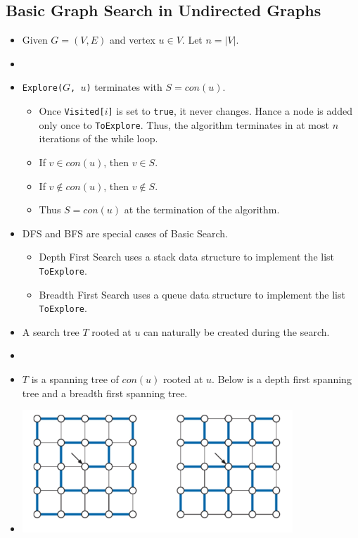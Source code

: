 \subsection{Basic Graph Search in Undirected Graphs}
\begin{itemize}
    \item Given $G = (V, E)$ and vertex $u \in V$. Let $n = \left|V\right|$.
    \item[] 
    \item \texttt{Explore($G$, $u$)} terminates with $S = con(u)$.
    \begin{itemize}
        \item Once \texttt{Visited[$i$]} is set to \texttt{true}, it never changes. Hance a node is added only once to \texttt{ToExplore}. Thus, the algorithm terminates in at most $n$ iterations of the while loop.
        \item If $v \in con(u)$, then $v \in S$.
        \item If $v \notin con(u)$, then $v \notin S$.
        \item Thus $S = con(u)$ at the termination of the algorithm.
    \end{itemize}
    \item DFS and BFS are special cases of Basic Search.
    \begin{itemize}
        \item Depth First Search uses a stack data structure to implement the list \texttt{ToExplore}.
        \item Breadth First Search uses a queue data structure to implement the list \texttt{ToExplore}.
    \end{itemize}
    \item A search tree $T$ rooted at $u$ can naturally be created during the search.
    \item[] 
    \item $T$ is a spanning tree of $con(u)$ rooted at $u$. Below is a depth first spanning tree and a breadth first spanning tree.
    \item[] \includegraphics[width=0.8\textwidth]{lecture15/images/spanning-tree.jpg}
\end{itemize}
